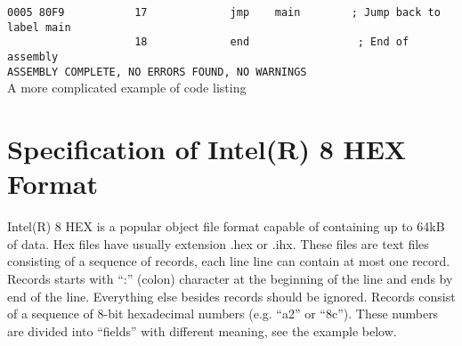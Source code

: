 \begin{code}[h]
                        {\color{highlight_lst_address}\verb'0005'}{\color{highlight_lst_code}\verb' 80F9'}{\color{highlight_lst_line}\verb'           17'}\verb'             '{\color{highlight_instruction}\verb'jmp'}\verb'    '{\color{highlight_constant}\verb'main'}\verb'        '{\color{highlight_comment}\verb'; Jump back to label main'}\\
                        {\color{highlight_lst_line}\verb'                    18'}\verb'             '{\color{highlight_directive}\verb'end'}\verb'                 '{\color{highlight_comment}\verb'; End of assembly'}\\
                        {\color{highlight_lst_msg}\verb'ASSEMBLY COMPLETE,'}\verb' NO ERRORS FOUND, NO WARNINGS'\\
                        \caption{A more complicated example of code listing}
                \end{code}

        \section{Specification of Intel(R) 8 HEX Format}
                Intel(R) 8 HEX is a popular object file format capable of containing up to
       64kB of data. Hex files have usually extension .hex or .ihx. These files are text files
       consisting of a sequence of records, each line line can contain at most one record.
       Records starts with ``:'' (colon) character at the beginning of the line and ends by
       end of the line. Everything else besides records should be ignored. Records consist
       of a sequence of 8-bit hexadecimal numbers (e.g. ``a2'' or ``8c''). These numbers are
       divided into ``fields'' with different meaning, see the example below.

